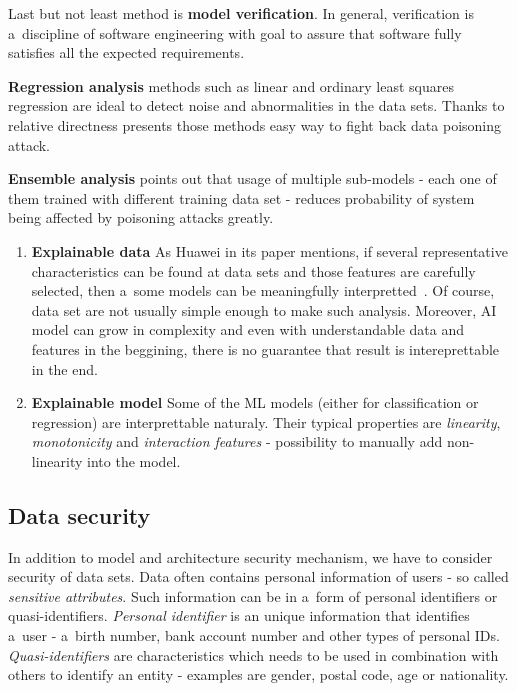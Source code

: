 Last but not least method is \textbf{model verification}.
In general, verification is a~discipline of software engineering with goal to assure that software fully satisfies all the expected requirements.

\textbf{Regression analysis} methods such as linear and ordinary least squares regression are ideal to detect noise and abnormalities in the data sets.
Thanks to relative directness presents those methods easy way to fight back data poisoning attack.

\textbf{Ensemble analysis} points out that usage of multiple sub-models - each one of them trained with different training data set - reduces probability of system being affected by poisoning attacks greatly.

\begin{enumerate}
    \item \textbf{Explainable data}
    As Huawei in its paper mentions, if several representative characteristics can be found at data sets and those features are carefully selected, then a~some models can be meaningfully interpretted~\cite{huawei_security}.
    Of course, data set are not usually simple enough to make such analysis.
    Moreover, AI model can grow in complexity and even with understandable data and features in the beggining, there is no guarantee that result is intereprettable in the end.

    \item \textbf{Explainable model}
    Some of the ML models (either for classification or regression) are interprettable naturaly.
    Their typical properties are \textit{linearity}, \textit{monotonicity} and \textit{interaction features} - possibility to manually add non-linearity into the model.
\end{enumerate}

\subsection{Data security}\label{subsec:data-security}

In addition to model and architecture security mechanism, we have to consider security of data sets.
Data often contains personal information of users - so called \textit{sensitive attributes}.
Such information can be in a~form of personal identifiers or quasi-identifiers.
\textit{Personal identifier} is an unique information that identifies a~user - a~birth number, bank account number and other types of personal IDs.
\textit{Quasi-identifiers} are characteristics which needs to be used in combination with others to identify an entity - examples are gender, postal code, age or nationality.

